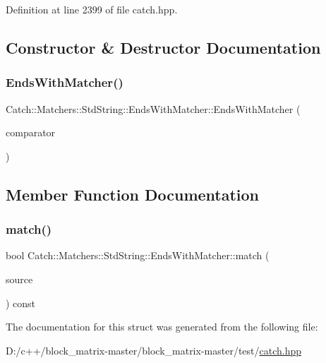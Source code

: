 Definition at line 2399 of file catch.\+hpp.



\subsection{Constructor \& Destructor Documentation}
\mbox{\label{struct_catch_1_1_matchers_1_1_std_string_1_1_ends_with_matcher_aa5ec700b4629562f74f362080accfd7b}} 
\subsubsection{\texorpdfstring{Ends\+With\+Matcher()}{EndsWithMatcher()}}
{\footnotesize\ttfamily Catch\+::\+Matchers\+::\+Std\+String\+::\+Ends\+With\+Matcher\+::\+Ends\+With\+Matcher (\begin{DoxyParamCaption}\item[{\mbox{\hyperlink{struct_catch_1_1_matchers_1_1_std_string_1_1_cased_string}{Cased\+String}} const \&}]{comparator }\end{DoxyParamCaption})}



\subsection{Member Function Documentation}
\mbox{\label{struct_catch_1_1_matchers_1_1_std_string_1_1_ends_with_matcher_aca2741fa57374a2a98d2a84ac3e13a6d}} 
\subsubsection{\texorpdfstring{match()}{match()}}
{\footnotesize\ttfamily bool Catch\+::\+Matchers\+::\+Std\+String\+::\+Ends\+With\+Matcher\+::match (\begin{DoxyParamCaption}\item[{std\+::string const \&}]{source }\end{DoxyParamCaption}) const\hspace{0.3cm}{\ttfamily [override]}}



The documentation for this struct was generated from the following file\+:\begin{DoxyCompactItemize}
\item 
D\+:/c++/block\+\_\+matrix-\/master/block\+\_\+matrix-\/master/test/\mbox{\hyperlink{catch_8hpp}{catch.\+hpp}}\end{DoxyCompactItemize}
